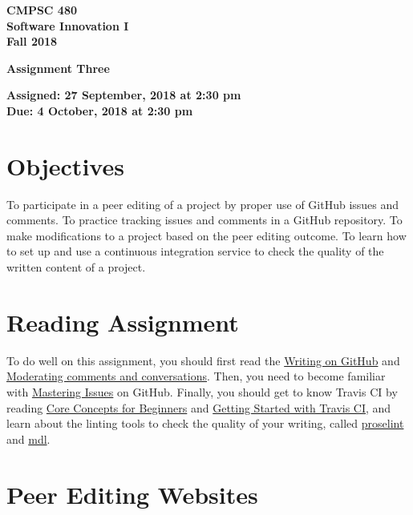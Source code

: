 \documentclass[11pt]{article}
\newcommand{\assignmentduedate}{4 October}
\newcommand{\assignmentassignedate}{ 27 September}
\newcommand{\assignmentnumber}{Three}
\newcommand{\labyear}{2018}
\newcommand{\labtime}{2:30 pm}
\newcommand{\assigneddate}{Assigned:  \assignmentassignedate, \labyear{} at \labtime{}}
\newcommand{\duedate}{Due:  \assignmentduedate, \labyear{} at \labtime{}}
\newcommand{\labtitle}[1]
{
  \begin{center}
    \begin{center}
      \bf
      CMPSC 480 \\ Software Innovation I\\
      Fall 2018\\
      \medskip
    \end{center}
    \bf
    #1
  \end{center}
}
\begin{document}
\thispagestyle{empty}

\labtitle{Assignment \assignmentnumber{} }
\begin{center} \textbf{ \assigneddate{} \\ \duedate{} } \end{center} 
\noindent \textbf{ }

\section*{Objectives}


To participate in a peer editing of a project by proper use of GitHub issues and comments. To practice tracking issues and comments in a GitHub repository. To make modifications to a project based on the peer editing outcome. To learn how to set up and use a continuous integration service to check the quality of the written content of a project. 

\section*{Reading Assignment}

To do well on this assignment, you
should first read the \href{https://help.github.com/categories/writing-on-github/}{Writing on GitHub} and \href{https://help.github.com/articles/moderating-comments-and-conversations/}{Moderating comments and conversations}.
Then, you need to become familiar with \href{https://guides.github.com/features/issues/}{Mastering Issues} on GitHub. Finally, you should get to know Travis CI by reading \href{https://docs.travis-ci.com/user/for-beginners}{Core Concepts for Beginners} and \href{https://docs.travis-ci.com/user/getting-started/}{Getting Started with Travis CI}, and learn about the linting tools to check the quality of your writing, called \href{https://github.com/amperser/proselint}{proselint} and \href{https://github.com/markdownlint/markdownlint}{mdl}.

\section*{Peer Editing Websites}
\end{document}

